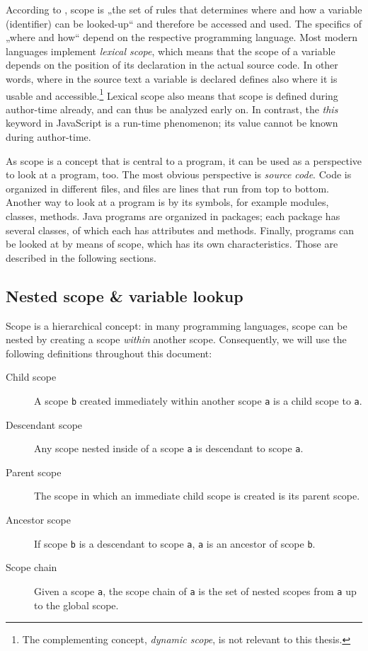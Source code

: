 According to , scope is „the set of rules that
determines where and how a variable (identifier) can be looked-up“ and
therefore be accessed and used. The specifics of „where and how“ depend
on the respective programming language. Most modern languages implement
\emph{lexical scope}, which means that the scope of a variable depends
on the position of its declaration in the actual source code. In other
words, where in the source text a variable is declared defines also
where it is usable and
accessible.\footnote{The complementing concept, \emph{dynamic scope}, is not relevant to this thesis.}
Lexical scope also means that scope is defined during author-time
already, and can thus be analyzed early on. In contrast, the \emph{this}
keyword in JavaScript is a run-time phenomenon; its value cannot be
known during author-time.

As scope is a concept that is central to a program, it can be used as a
perspective to look at a program, too. The most obvious perspective is
\emph{source code}. Code is organized in different files, and files are
lines that run from top to bottom. Another way to look at a program is
by its symbols, for example modules, classes, methods. Java programs are
organized in packages; each package has several classes, of which each
has attributes and methods. Finally, programs can be looked at by means
of scope, which has its own characteristics. Those are described in the
following sections.

\subsection{Nested scope \& variable
lookup}\label{nested-scope-variable-lookup}

Scope is a hierarchical concept: in many programming languages, scope
can be nested by creating a scope \emph{within} another scope.
Consequently, we will use the following definitions throughout this
document:

\begin{description}
\item[Child scope]
A scope \texttt{b} created immediately within another scope \texttt{a}
is a child scope to \texttt{a}.
\item[Descendant scope]
Any scope nested inside of a scope \texttt{a} is descendant to scope
\texttt{a}.
\item[Parent scope]
The scope in which an immediate child scope is created is its parent
scope.
\item[Ancestor scope]
If scope \texttt{b} is a descendant to scope \texttt{a}, \texttt{a} is
an ancestor of scope \texttt{b}.
\item[Scope chain]
Given a scope \texttt{a}, the scope chain of \texttt{a} is the set of
nested scopes from \texttt{a} up to the global scope.
\end{description}

